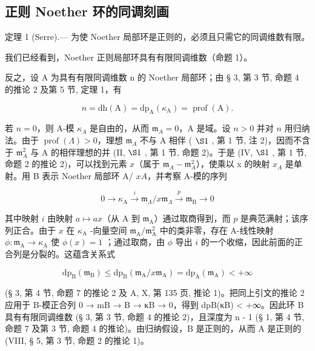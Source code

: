 \subsection{正则 Noether 环的同调刻画}

定理 1 (Serre).--- 为使 Noether 局部环是正则的，必须且只需它的同调维数有限。

我们已经看到，Noether 正则局部环具有有限同调维数（命题 1）。

反之，设 A 为具有有限同调维数 n 的 Noether 局部环；由 § 3, 第 3 节, 命题 4 的推论 2 及第 5 节, 定理 1，有

\[
n = \mathrm{dh} (\mathrm{A}) = \mathrm{dp} _ {\mathrm{A}} (\kappa_ {\mathrm{A}}) = \operatorname{prof} (\mathrm{A}).
\]

若 \(n=0\)，则 A-模 \(\kappa_{A}\) 是自由的，从而 \(\mathfrak{m}_{A}=0\)，A 是域。设 \(n>0\) 并对 \(n\) 用归纳法。由于 \(\operatorname{prof}(\Lambda)>0\)，理想 \(\mathfrak{m}_{A}\) 不与 A 相伴 ( \(\S 1\) , 第 1 节, 注 2)，因而不含于 \(\mathfrak{m}_{A}^{2}\) 与 A 的相伴理想的并 (II, \(\S 1\) , 第 1 节, 命题 2)。于是 (IV, \(\S 1\) , 第 1 节, 命题 2 的推论 2)，可以找到元素 \(x\)（属于 \(\mathfrak{m}_{A}-\mathfrak{m}_{A}^{2}\)），使乘以 x 的映射 \(x_{A}\) 是单射。用 B 表示 Noether 局部环 A/ \(xA\)，并考察 A-模的序列

\[
0 \to \kappa_ {\mathrm{A}} \stackrel {i} {\longrightarrow} \mathfrak {m} _ {\Lambda} / x \mathfrak {m} _ {\Lambda} \stackrel {p} {\longrightarrow} \mathfrak {m} _ {\mathrm{B}} \to 0
\]

其中映射 \(i\) 由映射 \(a \mapsto ax\)（从 A 到 \(\mathfrak{m}_{\mathrm{A}}\)）通过取商得到，而 \(p\) 是典范满射；该序列正合。由于 \(x\) 在 \(\kappa_{\mathrm{A}}\) -向量空间 \(\mathfrak{m}_{\mathrm{A}} / \mathfrak{m}_{\mathrm{A}}^{2}\) 中的类非零，存在 A-线性映射 \(\phi : \mathfrak{m}_{\mathrm{A}} \to \kappa_{\mathrm{A}}\) 使 \(\phi(x) = 1\) ；通过取商，由 \(\phi\) 导出 \(i\) 的一个收缩，因此前面的正合列是分裂的。这蕴含关系式

\[
\mathrm{dp} _ {\mathrm{B}} \left(\mathfrak {m} _ {\mathrm{B}}\right) \leqslant \mathrm{dp} _ {\mathrm{B}} \left(\mathfrak {m} _ {\mathrm{A}} / x \mathfrak {m} _ {\mathrm{A}}\right) = \mathrm{dp} _ {\mathrm{A}} \left(\mathfrak {m} _ {\mathrm{A}}\right) <   + \infty
\]

(§ 3, 第 4 节, 命题 7 的推论 2 及 A, X, 第 135 页, 推论 1)。把同上引文的推论 2 应用于 B-模正合列 0 → mB → B → κB → 0，得到 dpB(κB) \textless{} +∞。因此环 B 具有有限同调维数 (§ 3, 第 3 节, 命题 4 的推论 2)，且深度为 n - 1 (§ 1, 第 4 节, 命题 7 及第 3 节, 命题 4 的推论)。由归纳假设，B 是正则的，从而 A 是正则的 (VIII, § 5, 第 3 节, 命题 2 的推论 1)。

